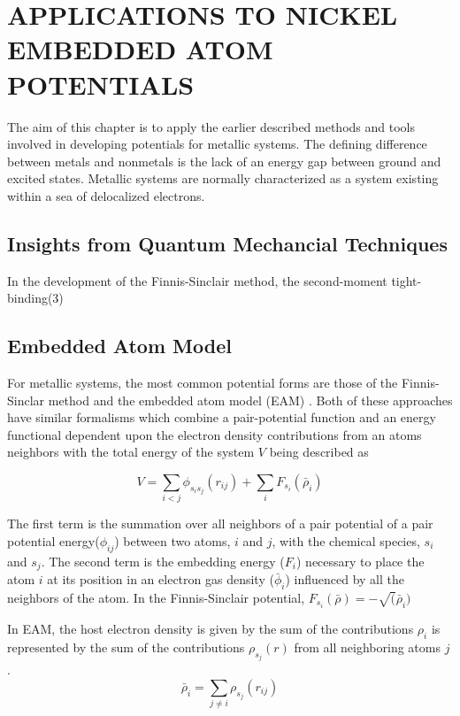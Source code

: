 \chapter{APPLICATIONS TO NICKEL EMBEDDED ATOM POTENTIALS}

The aim of this chapter is to apply the earlier described methods and tools involved in developing potentials for metallic systems.  The defining difference between metals and nonmetals is the lack of an energy gap between ground and excited states.  Metallic systems are normally characterized as a system existing within a sea of delocalized electrons.

\section{Insights from Quantum Mechancial Techniques}

In the development of the Finnis-Sinclair method, the second-moment tight-binding(3)



\section{Embedded Atom Model}

For metallic systems, the most common potential forms are those of the Finnis-Sinclar method\cite{finnis1984_potential_fs} and the embedded atom model (EAM) \cite{daw1984_potential_eam}.  
Both of these approaches have similar formalisms which combine a pair-potential function and an energy functional dependent upon the electron density contributions from an atoms neighbors with the total energy of the system $V$ being described as 

\begin{equation}
  V=\sum_{i<j}\phi_{s_i s_j}(r_{ij})
	+\sum_{i}F_{s_i}(\bar{\rho}_{i})
\end{equation}

The first term is the summation over all neighbors of a pair potential of a pair potential energy($\phi_{ij}$) between two atoms, $i$ and $j$, with the chemical species, $s_i$ and $s_j$.  
The second term is the embedding energy ($F_i$) necessary to place the atom $i$ at its position in an electron gas density ($\bar{\phi}_i$) influenced by all the neighbors of the atom.  
In the Finnis-Sinclair potential, $F_{s_i}(\bar{\rho})=-\sqrt(\bar{\rho}_i)$ 

In EAM, the host electron density is given by the sum of the contributions $\rho_i$ is represented by the sum of the contributions $\rho_{s_j}(r)$ from all neighboring atoms $j$.
\begin{equation}
	\bar{\rho}_i = \sum_{j \neq i} \rho_{s_j}(r_{ij})
\end{equation}



